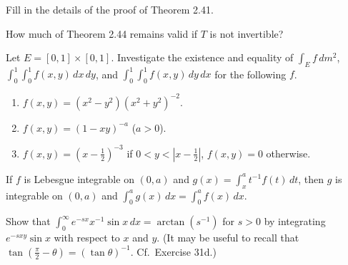 	\begin{exercise}[Folland 2.53]
		Fill in the details of the proof of Theorem 2.41.
	\end{exercise}
	\begin{solution}

	\end{solution}

	\begin{exercise}[Folland 2.54]
		How much of Theorem 2.44 remains valid if $T$ is not invertible?
	\end{exercise}
	\begin{solution}

	\end{solution}

	\begin{exercise}[Folland 2.55]
		Let $E = [0, 1] \times [0, 1]$. Investigate the existence and equality of $\int_E f \, dm^2$, $\int_0^1 \int_0^1 f(x, y) \, dx \, dy$, and $\int_0^1 \int_0^1 f(x, y) \, dy \, dx$ for the following $f$.
		\begin{enumerate}[label=\textbf{\alph*.}]
			\item $f(x, y) = (x^2 - y^2)(x^2 + y^2)^{-2}$.
			\item $f(x, y) = (1 - xy)^{-a}$ ($a > 0$).
			\item $f(x, y) = (x - \frac{1}{2})^{-3}$ if $0 < y < |x - \frac{1}{2}|$, $f(x, y) = 0$ otherwise.
		\end{enumerate}
	\end{exercise}
	\begin{solution}

	\end{solution}

	\begin{exercise}[Folland 2.56]
		If $f$ is Lebesgue integrable on $(0, a)$ and $g(x) = \int_x^a t^{-1}f(t) \, dt$, then $g$ is integrable on $(0, a)$ and $\int_0^a g(x) \, dx = \int_0^a f(x) \, dx$.
	\end{exercise}
	\begin{solution}

	\end{solution}

	\begin{exercise}[Folland 2.57]
		Show that $\int_0^\infty e^{-sx} x^{-1} \sin x \, dx = \arctan(s^{-1})$ for $s > 0$ by integrating $e^{-sxy} \sin x$ with respect to $x$ and $y$. (It may be useful to recall that $\tan(\frac{\pi}{2} - \theta) = (\tan\theta)^{-1}$. Cf.\ Exercise 31d.)
	\end{exercise}
	\begin{solution}

	\end{solution}


